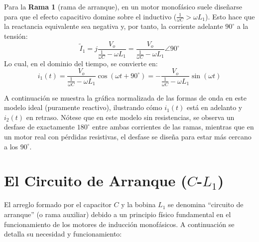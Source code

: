 \documentclass[12pt, a4paper]{article}
\begin{document}
Para la \textbf{Rama 1} (rama de arranque), en un motor monofásico suele diseñarse para que el efecto capacitivo domine sobre el inductivo ($\frac{1}{\omega C} > \omega L_1$). Esto hace que la reactancia equivalente sea negativa y, por tanto, la corriente adelante $90^\circ$ a la tensión:
\begin{equation}
    \tilde{I}_1 = j \frac{V_o}{\frac{1}{\omega C} - \omega L_1} = \frac{V_o}{\frac{1}{\omega C} - \omega L_1} \angle 90^\circ
\end{equation}
Lo cual, en el dominio del tiempo, se convierte en:
\begin{equation}
    i_1(t) = \frac{V_o}{\frac{1}{\omega C} - \omega L_1} \cos(\omega t + 90^\circ) = - \frac{V_o}{\frac{1}{\omega C} - \omega L_1} \sin(\omega t)
\end{equation}

A continuación se muestra la gráfica normalizada de las formas de onda en este modelo ideal (puramente reactivo), ilustrando cómo $i_1(t)$ está en adelanto y $i_2(t)$ en retraso. Nótese que en este modelo sin resistencias, se observa un desfase de exactamente $180^\circ$ entre ambas corrientes de las ramas, mientras que en un motor real con pérdidas resistivas, el desfase se diseña para estar más cercano a los $90^\circ$.

\begin{center}
\end{center}

\section*{El Circuito de Arranque ($C$-$L_1$)}
El arreglo formado por el capacitor $C$ y la bobina $L_1$ se denomina ``circuito de arranque'' (o rama auxiliar) debido a un principio físico fundamental en el funcionamiento de los motores de inducción monofásicos. A continuación se detalla su necesidad y funcionamiento:
\end{document}
